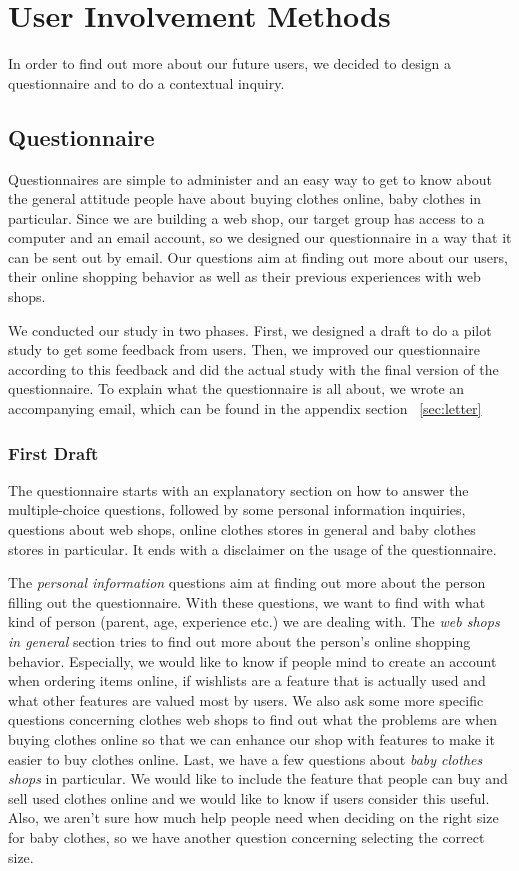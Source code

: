 \section{User Involvement Methods}
In order to find out more about our future users, we decided to design a questionnaire and to do a contextual inquiry. 

\subsection{Questionnaire}
Questionnaires are simple to administer and an easy way to get to know about the general attitude people have about buying clothes online, baby clothes in particular. Since we are building a web shop, our target group has access to a computer and an email account, so we designed our questionnaire in a way that it can be sent out by email. Our questions aim at finding out more about our users, their online shopping behavior as well as their previous experiences with web shops. 

We conducted our study in two phases. First, we designed a draft to do a pilot study to get some feedback from users. Then, we improved our questionnaire according to this feedback and did the actual study with the final version of the questionnaire. To explain what the questionnaire is all about, we wrote an accompanying email, which can be found in the appendix section ~\ref{sec:letter}

\subsubsection{First Draft}
The questionnaire starts with an explanatory section on how to answer the multiple-choice questions, followed by some personal information inquiries, questions about web shops, online clothes stores in general and baby clothes stores in particular. It ends with a disclaimer on the usage of the questionnaire.

The \textit{personal information} questions aim at finding out more about the person filling out the questionnaire. With these questions, we want to find with what kind of person (parent, age, experience etc.) we are dealing with. The \textit{web shops in general} section tries to find out more about the person's online shopping behavior. Especially, we would like to know if people mind to create an account when ordering items online, if wishlists are a feature that is actually used and what other features are valued most by users.
We also ask some more specific questions concerning clothes web shops to find out what the problems are when buying clothes online so that we can enhance our shop with features to make it easier to buy clothes online. 
Last, we have a few questions about \textit{baby clothes shops} in particular. We would like to include the feature that people can buy and sell used clothes online and we would like to know if users consider this useful. Also, we aren't sure how much help people need when deciding on the right size for baby clothes, so we have another question concerning selecting the correct size.

